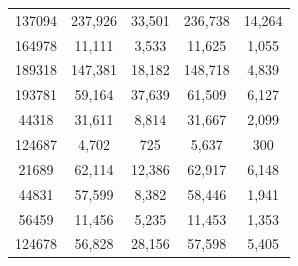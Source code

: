 \documentclass[conference]{IEEEtran}
\begin{document}
\begin{table}[]
\begin{center}
\begin{tabular}{ccccc}
137094 & 237,926 & 33,501 & 236,738 & 14,264 \\
164978 & 11,111 & 3,533 & 11,625 & 1,055 \\
189318 & 147,381 & 18,182 & 148,718 & 4,839 \\
193781 & 59,164 & 37,639 & 61,509 & 6,127 \\
44318 & 31,611 & 8,814 & 31,667 & 2,099 \\
124687 & 4,702 & 725 & 5,637 & 300 \\
21689 & 62,114 & 12,386 & 62,917 & 6,148 \\
44831 & 57,599 & 8,382 & 58,446 & 1,941 \\
56459 & 11,456 & 5,235 & 11,453 & 1,353 \\
124678 & 56,828 & 28,156 & 57,598 & 5,405 \\
  \hline
  \end{tabular}
  \label{tab.res_cost_working_day}
  \end{center}
\end{table}
\end{document}
